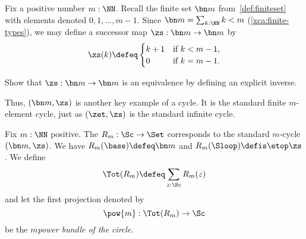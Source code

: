 Fix a positive number $m:\NN$. Recall the finite set $\bn m$ from~\cref{def:finiteset} with elements denoted $0,1,\dots,m-1$.
Since $\bn m = \sum_{k:\NN}k<m$ (\cref{xca:finite-types}),
we may define a successor map $\zs : \bn m \to \bn m$ by
\[
  \zs(k) \defeq
  \begin{cases}
    k+1 & \text{if $k<m-1$,} \\
    0   & \text{if $k=m-1$.}
  \end{cases}
\]
\begin{exercise}
  Show that $\zs : \bn m \to \bn m$ is an equivalence by defining
  an explicit inverse.
\end{exercise}
Thus, $(\bn m,\zs)$ is another key example of a cycle.
It is the standard finite $m$-element cycle,
just as $(\zet,\zs)$ is the standard infinite cycle.
\begin{definition}\label{def:RmtoS1}
  Fix $m:\NN$ positive.
  The \covering $R_m : \Sc\to\Set$ corresponds to the standard $m$-cycle
  $(\bn m,\zs)$. We have $R_m(\base) \defeq \bn m$ and
  $R_m(\Sloop) \defis \etop\zs$. We define
  \[
    \Tot(R_m) \defeq \sum_{z:\Sc} R_m(z)
  \]
  and let the first projection denoted by
  \[
    \pow{m} : \Tot(R_m) \to \Sc
  \]
  be the \emph{$m$\th power bundle of the circle}.
\end{definition}
